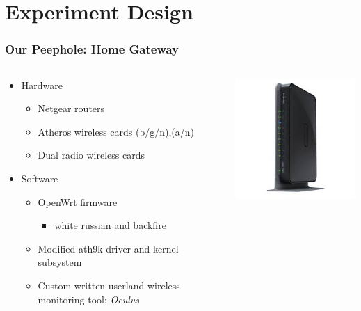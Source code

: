 \documentclass{beamer}
\begin{document}
\section{Experiment Design}
\begin{frame}
  \frametitle{Our Peephole: Home Gateway}
  \begin{columns} [onlytextwidth]%
    \begin{column}{.6\textwidth}
      \begin{itemize} 
      \item Hardware
        \begin{itemize} 
        \item Netgear routers
        \item Atheros wireless cards (b/g/n),(a/n)
        \item Dual radio wireless cards
        \end{itemize}
      \item Software
        \begin{itemize} 
        \item OpenWrt firmware
          \begin{itemize} 
          \item white russian and backfire
          \end{itemize}
        \item Modified ath9k driver and kernel subsystem
        \item Custom written userland wireless monitoring tool: \textit{Oculus}
        \end{itemize}
      \end{itemize}
  \end{column}
  \begin{column}{.4\textwidth}
    \includegraphics[width=.8\textwidth]{./images/router.png}
  \end{column}
\end{columns}
\end{frame}
\end{document}
